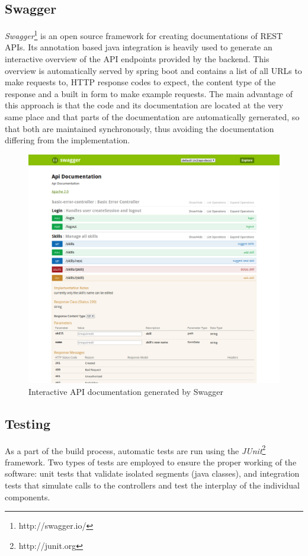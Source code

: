 \subsection{Swagger}
\textit{Swagger}\footnote{http://swagger.io/} is an open source framework for creating documentations of REST APIs.
Its annotation based java integration is heavily used to generate an interactive overview of the API endpoints provided by the
backend. This overview is automatically served by spring boot and contains a list of all URLs to make requests to, HTTP response codes to expect, the content type of the response and a built in form to make example requests. The main advantage of this approach is that the code and its documentation are located at the very same place and that parts of the documentation are automatically gernerated, so that both are maintained synchronously, thus avoiding the documentation differing from the implementation.
\begin{figure}[H]
    \centering
    \includegraphics[width=\textwidth]{images/swagger_ui.png}
    \caption[Swagger Interactive Documentation]{Interactive API documentation generated by Swagger}
    \label{fig:markovchain}
\end{figure}

\subsection{Testing}
As a part of the build process, automatic tests are run using the \textit{JUnit}\footnote{http://junit.org} framework. Two types of tests are employed to ensure the proper working of the software: unit tests that validate isolated segments (java classes), and integration tests that simulate calls to the controllers and test the
interplay of the individual components.

